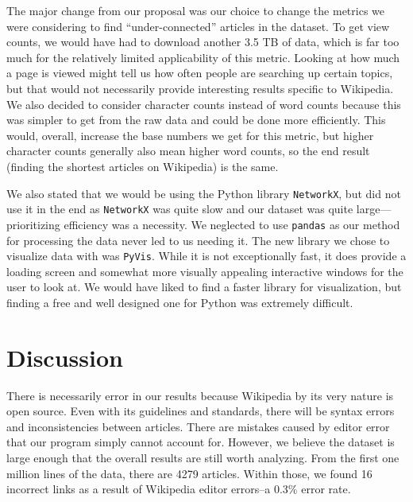 \documentclass[fontsize=12pt]{article}
\begin{document}
\begin{multicols}{2}
    The major change from our proposal was our choice to change the metrics we were considering to find ``under-connected'' articles in the dataset.
    To get view counts, we would have had to download another 3.5 TB of data, which is far too much for the relatively limited applicability of this metric.
    Looking at how much a page is viewed might tell us how often people are searching up certain topics, but that would not necessarily provide interesting results specific to Wikipedia.
    We also decided to consider character counts instead of word counts because this was simpler to get from the raw data and could be done more efficiently.
    This would, overall, increase the base numbers we get for this metric, but higher character counts generally also mean higher word counts, so the end result (finding the shortest articles on Wikipedia) is the same.

    We also stated that we would be using the Python library \texttt{NetworkX}, but did not use it in the end as \texttt{NetworkX} was quite slow and our dataset was quite large---prioritizing efficiency was a necessity.
    We neglected to use \texttt{pandas} as our method for processing the data never led to us needing it.
    The new library we chose to visualize data with was \texttt{PyVis}.
    While it is not exceptionally fast, it does provide a loading screen and somewhat more visually appealing interactive windows for the user to look at.
    We would have liked to find a faster library for visualization, but finding a free and well designed one for Python was extremely difficult.

    \section{Discussion}

    There is necessarily error in our results because Wikipedia by its very nature is open source.
    Even with its guidelines and standards, there will be syntax errors and inconsistencies between articles.
    There are mistakes caused by editor error that our program simply cannot account for.
    However, we believe the dataset is large enough that the overall results are still worth analyzing.
    From the first one million lines of the data, there are 4279 articles.
    Within those, we found 16 incorrect links as a result of Wikipedia editor errors--a 0.3\% error rate.



\end{multicols}
\end{document}
